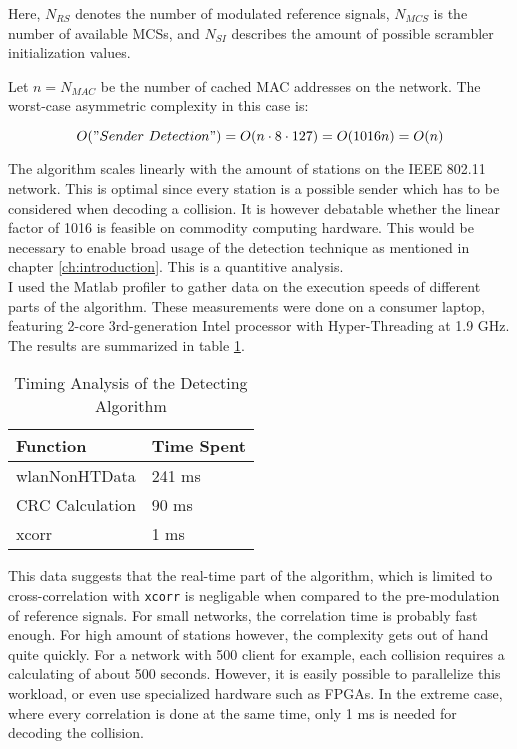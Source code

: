 Here, $ N_{RS} $ denotes the number of modulated reference signals, $ N_{MCS} $ is the number of available \glspl{MCS}, and $ N_{SI} $ describes the amount of possible scrambler initialization values.

Let $ n = N_{MAC} $ be the number of cached MAC addresses on the network. The worst-case asymmetric complexity in this case is:

$$ O("Sender ~Detection") = O(n \cdot 8 \cdot 127) = O(1016 n) = O(n) $$\vspace{0cm}

The algorithm scales linearly with the amount of stations on the IEEE 802.11 network. This is optimal since every station is a possible sender which has to be considered when decoding a collision. It is however debatable whether the linear factor of 1016 is feasible on commodity computing hardware. This would be necessary to enable broad usage of the detection technique as mentioned in chapter \ref{ch:introduction}. This is a quantitive analysis.\\

I used the Matlab profiler to gather data on the execution speeds of different parts of the algorithm. These measurements were done on a consumer laptop, featuring 2-core 3rd-generation Intel processor with Hyper-Threading at 1.9 GHz. The results are summarized in table \ref{tbl:timing}.

\begin{table}[ht]
	\centering
	\begin{tabular}{|p{8.5cm}|p{2.5cm}|}
		\hline
		\textbf{Function} & \textbf{Time Spent} \\ \hline
    wlanNonHTData & 241 ms \\ \hline
    CRC Calculation & 90 ms \\ \hline
		xcorr & 1 ms \\ \hline
	\end{tabular}
	\caption{Timing Analysis of the Detecting Algorithm \label{tbl:timing}}
\end{table}

This data suggests that the real-time part of the algorithm, which is limited to cross-correlation with \texttt{xcorr} is negligable when compared to the pre-modulation of reference signals. For small networks, the correlation time is probably fast enough. For high amount of stations however, the complexity gets out of hand quite quickly. For a network with 500 client for example, each collision requires a calculating of about 500 seconds. However, it is easily possible to parallelize this workload, or even use specialized hardware such as \glspl{FPGA}. In the extreme case, where every correlation is done at the same time, only 1 ms is needed for decoding the collision.


